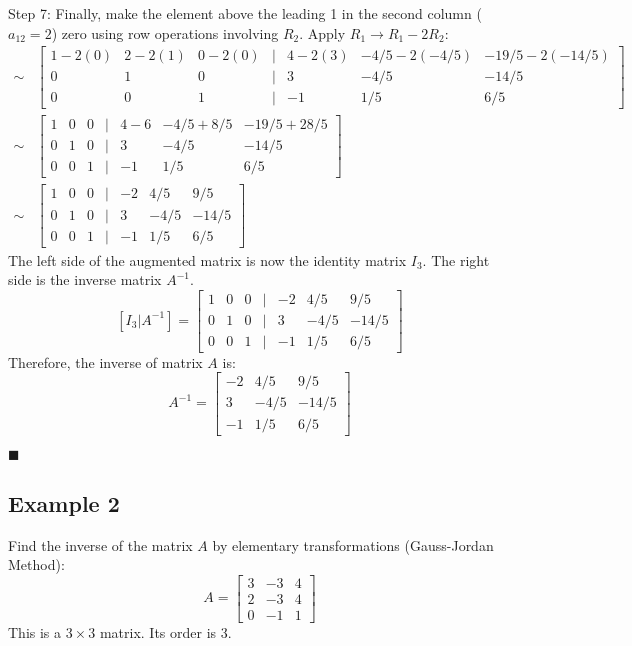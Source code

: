 \documentclass{article}
\begin{document}
Step 7: Finally, make the element above the leading 1 in the second column ($a_{12}=2$) zero using row operations involving $R_2$.
Apply $R_1 \to R_1 - 2R_2$:
\begin{align*} \sim &\begin{bmatrix} 1 - 2(0) & 2 - 2(1) & 0 - 2(0) & | & 4 - 2(3) & -4/5 - 2(-4/5) & -19/5 - 2(-14/5) \\ 0 & 1 & 0 & | & 3 & -4/5 & -14/5 \\ 0 & 0 & 1 & | & -1 & 1/5 & 6/5 \end{bmatrix} \\ \sim &\begin{bmatrix} 1 & 0 & 0 & | & 4 - 6 & -4/5 + 8/5 & -19/5 + 28/5 \\ 0 & 1 & 0 & | & 3 & -4/5 & -14/5 \\ 0 & 0 & 1 & | & -1 & 1/5 & 6/5 \end{bmatrix} \\ \sim &\begin{bmatrix} 1 & 0 & 0 & | & -2 & 4/5 & 9/5 \\ 0 & 1 & 0 & | & 3 & -4/5 & -14/5 \\ 0 & 0 & 1 & | & -1 & 1/5 & 6/5 \end{bmatrix}\end{align*}
The left side of the augmented matrix is now the identity matrix $I_3$. The right side is the inverse matrix $A^{-1}$.
\[ [I_3 | A^{-1}] = \begin{bmatrix} 1 & 0 & 0 & | & -2 & 4/5 & 9/5 \\ 0 & 1 & 0 & | & 3 & -4/5 & -14/5 \\ 0 & 0 & 1 & | & -1 & 1/5 & 6/5 \end{bmatrix} \]
Therefore, the inverse of matrix $A$ is:
\[ A^{-1} = \begin{bmatrix} -2 & 4/5 & 9/5 \\ 3 & -4/5 & -14/5 \\ -1 & 1/5 & 6/5 \end{bmatrix} \]

\hfill $\blacksquare$

\subsection{Example 2} %
Find the inverse of the matrix $A$ by elementary transformations (Gauss-Jordan Method):
\[ A = \begin{bmatrix} 3 & -3 & 4 \\ 2 & -3 & 4 \\ 0 & -1 & 1 \end{bmatrix} \]
This is a $3 \times 3$ matrix. Its order is 3.
\end{document}
